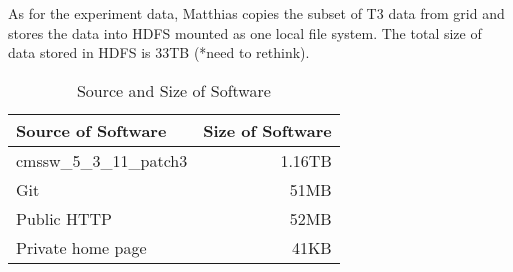\documentclass{acm_proc_article-sp}
\begin{document}
As for the experiment data, Matthias copies the subset of T3 data from grid and stores the data into HDFS mounted as one local file system. The total size of data stored in HDFS is 33TB (*need to rethink).

\begin{table}
    \centering
    \begin{tabular}{|l|r|}
        \hline
        Source of Software & Size of Software \\ \hline
        cmssw\_5\_3\_11\_patch3 & 1.16TB \\ \hline
        Git & 51MB \\ \hline
        Public HTTP & 52MB \\ \hline
        Private home page & 41KB \\ \hline
    \end{tabular}
    \caption{Source and Size of Software}
    \label{table:software-source-size}
\end{table}
\end{document}
